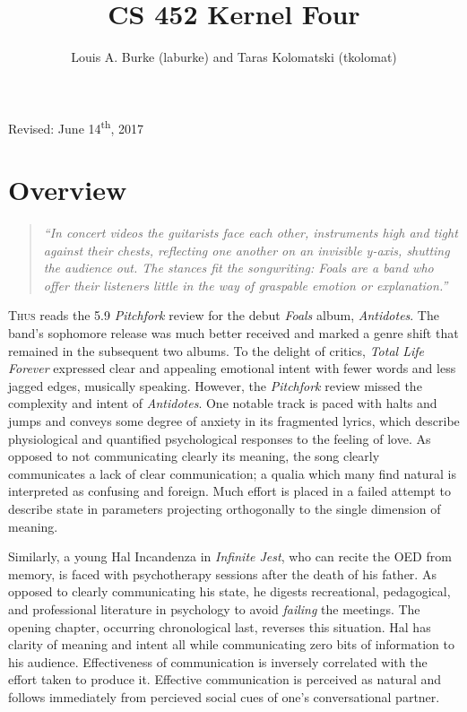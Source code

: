 \documentclass{article}
\title{CS 452 Kernel Four \vspace{-0.65cm}}
\date{Louis A. Burke (laburke) and Taras Kolomatski (tkolomat)}
\begin{document}
\maketitle

\begin{center}
\vspace{-0.58cm}
Revised: June 14\textsuperscript{th}, 2017
\end{center}

\section*{Overview}

\begin{quote}\textit{
``In concert videos the guitarists face each other, instruments high and
tight against their chests, reflecting one another on an invisible y-axis,
shutting the audience out. The stances fit the songwriting: Foals are a band
who offer their listeners little in the way of graspable emotion or
explanation.''} \end {quote}

\textsc{Thus} reads the 5.9 \textit{Pitchfork}
review for the debut \textit{Foals} album, \textit{Antidotes}. The band's
sophomore release was much better received and marked a genre shift that
remained in the subsequent two albums. To the delight of critics,
\textit{Total Life Forever} expressed clear and appealing emotional intent
with fewer words and less jagged edges, musically speaking. However, the
\textit{Pitchfork} review missed the complexity and intent of
\textit{Antidotes}. One notable track is paced with halts and jumps and
conveys some degree of anxiety in its fragmented lyrics, which describe
physiological and quantified psychological responses to the feeling of love.
As opposed to not communicating clearly its meaning, the song clearly
communicates a lack of clear communication; a qualia which many find natural
is interpreted as confusing and foreign. Much effort is placed in a failed
attempt to describe state in parameters projecting orthogonally to the
single dimension of meaning.

Similarly, a young Hal Incandenza in \textit{Infinite Jest}, who can recite the
OED from memory, is faced with psychotherapy sessions after the death of his
father. As opposed to clearly communicating his state, he digests
recreational, pedagogical, and professional literature in psychology to
avoid \textit{failing} the meetings. The opening chapter, occurring
chronological last, reverses this situation. Hal has clarity of meaning and
intent all while communicating zero bits of information to his audience.
Effectiveness of communication is inversely correlated with the effort taken
to produce it. Effective communication is perceived as natural and follows
immediately from percieved social cues of one's conversational partner.
\end{document}
